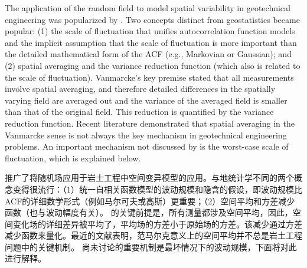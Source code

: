 \begin{ParaColumn}
    \switchcolumn

    The application of the random field to model spatial variability in geotechnical engineering was popularized by \citet{Vanmarcke19771227}. Two concepts distinct from geostatistics became popular: (1) the scale of fluctuation that unifies autocorrelation function models and the implicit assumption that the scale of fluctuation is more important than the detailed mathematical form of the ACF (e.g., Markovian or Gaussian); and (2) spatial averaging and the variance reduction function (which also is related to the scale of fluctuation). Vanmarcke's \citeyearpar{Vanmarcke1983} key premise stated that all measurements involve spatial averaging, and therefore detailed differences in the spatially varying field are averaged out and the variance of the averaged field is smaller than that of the original field. This reduction is quantified by the variance reduction function. Recent literature demonstrated that spatial averaging in the Vanmarcke sense is not always the key mechanism in geotechnical engineering problems. An important mechanism not discussed by \citet{Vanmarcke19771227,Vanmarcke1983} is the worst-case scale of fluctuation, which is explained below.

    \switchcolumn

    \citet{Vanmarcke19771227}推广了将随机场应用于岩土工程中空间变异模型的应用。与地统计学不同的两个概念变得很流行：（1）统一自相关函数模型的波动规模和隐含的假设，即波动规模比ACF的详细数学形式（例如马尔可夫或高斯）更重要；（2）空间平均和方差减少函数（也与波动幅度有关）。 \citet{Vanmarcke1983}的关键前提是，所有测量都涉及空间平均，因此，空间变化场的详细差异被平均了，平均场的方差小于原始场的方差。该减少通过方差减少函数来量化。最近的文献表明，范马尔克意义上的空间平均并不总是岩土工程问题中的关键机制。 \citet{Vanmarcke19771227,Vanmarcke1983}尚未讨论的重要机制是最坏情况下的波动规模，下面将对此进行解释。

    \switchcolumn*


\end{ParaColumn}
